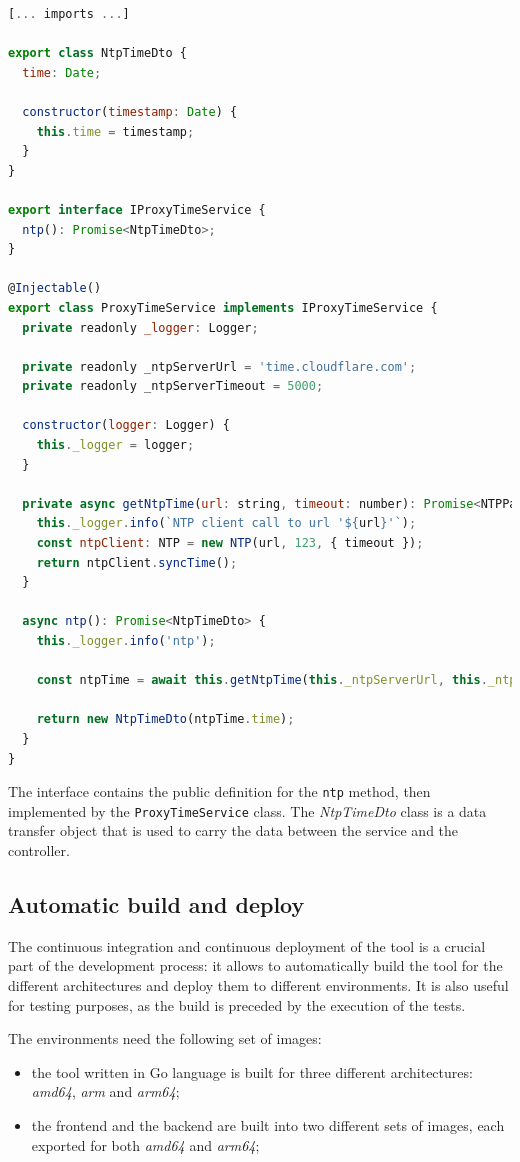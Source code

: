\begin{lstlisting}[language=Javascript, caption={Proxy service class}, label={lst:proxy-service}]
[... imports ...]

export class NtpTimeDto {
  time: Date;

  constructor(timestamp: Date) {
    this.time = timestamp;
  }
}

export interface IProxyTimeService {
  ntp(): Promise<NtpTimeDto>;
}

@Injectable()
export class ProxyTimeService implements IProxyTimeService {
  private readonly _logger: Logger;

  private readonly _ntpServerUrl = 'time.cloudflare.com';
  private readonly _ntpServerTimeout = 5000;

  constructor(logger: Logger) {
    this._logger = logger;
  }

  private async getNtpTime(url: string, timeout: number): Promise<NTPPacket> {
    this._logger.info(`NTP client call to url '${url}'`);
    const ntpClient: NTP = new NTP(url, 123, { timeout });
    return ntpClient.syncTime();
  }

  async ntp(): Promise<NtpTimeDto> {
    this._logger.info('ntp');

    const ntpTime = await this.getNtpTime(this._ntpServerUrl, this._ntpServerTimeout);

    return new NtpTimeDto(ntpTime.time);
  }
}
\end{lstlisting}

The interface contains the public definition for the \texttt{ntp} method, then implemented by the \texttt{ProxyTimeService} class. The \textit{NtpTimeDto} class is a data transfer object that is used to carry the data between the service and the controller.

\subsection{Automatic build and deploy}

The continuous integration and continuous deployment of the tool is a crucial part of the development process: it allows to automatically build the tool for the different architectures and deploy them to different environments. It is also useful for testing purposes, as the build is preceded by the execution of the tests.

The environments need the following set of images:
\begin{itemize}
  \item the tool written in Go language is built for three different architectures: \textit{amd64}, \textit{arm} and \textit{arm64};
  \item the frontend and the backend are built into two different sets of images, each exported for both \textit{amd64} and \textit{arm64};
\end{itemize}

